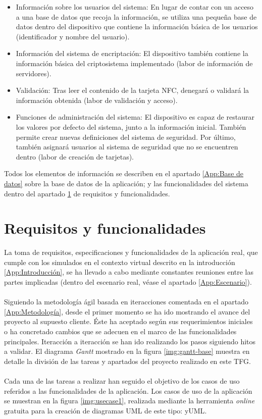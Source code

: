 \documentclass[../PFC.tex]{subfiles}
\begin{document}
\begin{itemize}
\item{Información sobre los usuarios del sistema: En lugar de contar con un acceso a una base de datos que recoja la información, se utiliza una pequeña base de datos dentro del dispositivo que contiene la información básica de los usuarios (identificador y nombre del usuario).}
\item{Información del sistema de encriptación: El dispositivo también contiene la información básica del criptosistema implementado (labor de información de servidores).}
\item{Validación: Tras leer el contenido de la tarjeta NFC, denegará o validará la información obtenida (labor de validación y acceso).}
\item{Funciones de administración del sistema: El dispositivo es capaz de restaurar los valores por defecto del sistema, junto a la información inicial. También permite crear nuevas definiciones del sistema de seguridad. Por último, también asignará usuarios al sistema de seguridad que no se encuentren dentro (labor de creación de tarjetas).}
\end{itemize}

Todos los elementos de información se describen en el apartado \ref{App:Base de datos} sobre la base de datos de la aplicación; y las funcionalidades del sistema dentro del apartado \ref{App:Requisitos y funcionalidades} de requisitos y funcionalidades.

\section{Requisitos y funcionalidades}
\label{App:Requisitos y funcionalidades}

La toma de requisitos, especificaciones y funcionalidades de la aplicación real, que cumple con los simulados en el contexto virtual descrito en la introducción \ref{App:Introducción}, se ha llevado a cabo mediante constantes reuniones entre las partes implicadas (dentro del escenario real, véase el apartado \ref{App:Escenario}). 
\\\\
Siguiendo la metodología ágil basada en iteracciones comentada en el apartado \ref{App:Metodología}, desde el primer momento se ha ido mostrando el avance del proyecto al supuesto cliente. Éste ha aceptado según sus requerimientos iniciales o ha concretado cambios que se adecuen en el marco de las funcionalidades principales.  Iteracción a iteracción se han ido realizando los pasos siguiendo hitos a validar. El diagrama \textit{Gantt} mostrado en la figura \ref{img:gantt-base} muestra en detalle la división de las tareas y apartados del proyecto realizado en este TFG.
\\\\
Cada una de las tareas a realizar han seguido el objetivo de los casos de uso referidos a las funcionalidades de la aplicación. Los casos de uso de la aplicación se muestran en la figura \ref{img:usecase1}, realizada mediante la herramienta \textit{online} gratuita para la creación de diagramas UML de este tipo: yUML\cite{yUML}.
\end{document}
